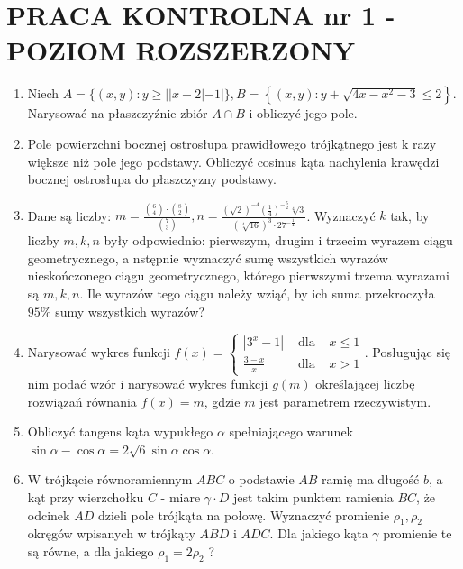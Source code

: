 \documentclass[10pt]{article}
\begin{document}
\section*{PRACA KONTROLNA nr 1 - POZIOM ROZSZERZONY}
\begin{enumerate}
  \item Niech $A=\{(x, y): y \geqslant||x-2|-1|\}, B=\left\{(x, y): y+\sqrt{4 x-x^{2}-3} \leqslant 2\right\}$. Narysować na płaszczyźnie zbiór $A \cap B$ i obliczyć jego pole.
  \item Pole powierzchni bocznej ostrosłupa prawidłowego trójkątnego jest k razy większe niż pole jego podstawy. Obliczyć cosinus kąta nachylenia krawędzi bocznej ostrosłupa do płaszczyzny podstawy.
  \item Dane są liczby: $m=\frac{\binom{6}{4} \cdot\binom{8}{2}}{\binom{7}{3}}, n=\frac{(\sqrt{2})^{-4}\left(\frac{1}{4}\right)^{-\frac{5}{2}} \sqrt[4]{3}}{(\sqrt[4]{16})^{3} \cdot 27^{-\frac{1}{4}}}$. Wyznaczyć $k$ tak, by liczby $m, k, n$ były odpowiednio: pierwszym, drugim i trzecim wyrazem ciągu geometrycznego, a nstępnie wyznaczyć sumę wszystkich wyrazów nieskończonego ciągu geometrycznego, którego pierwszymi trzema wyrazami są $m, k, n$. Ile wyrazów tego ciągu należy wziąć, by ich suma przekroczyła $95 \%$ sumy wszystkich wyrazów?
  \item Narysować wykres funkcji $f(x)=\left\{\begin{array}{lll}\left|3^{x}-1\right| & \text { dla } & x \leqslant 1 \\ \frac{3-x}{x} & \text { dla } & x>1\end{array}\right.$. Posługując się nim podać wzór i narysować wykres funkcji $g(m)$ określającej liczbę rozwiązań równania $f(x)=m$, gdzie $m$ jest parametrem rzeczywistym.
  \item Obliczyć tangens kąta wypukłego $\alpha$ spełniającego warunek $\sin \alpha-\cos \alpha=2 \sqrt{6} \sin \alpha \cos \alpha$.
  \item W trójkącie równoramiennym $A B C$ o podstawie $A B$ ramię ma długość $b$, a kąt przy wierzchołku $C$ - miare $\gamma \cdot D$ jest takim punktem ramienia $B C$, że odcinek $A D$ dzieli pole trójkąta na połowę. Wyznaczyć promienie $\rho_{1}, \rho_{2}$ okręgów wpisanych w trójkąty $A B D$ i $A D C$. Dla jakiego kąta $\gamma$ promienie te są równe, a dla jakiego $\rho_{1}=2 \rho_{2}$ ?
\end{enumerate}
\end{document}
